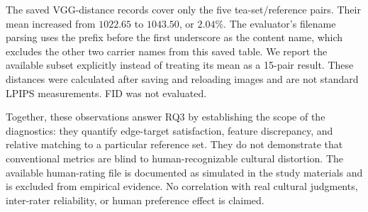 The saved VGG-distance records cover only the five tea-set/reference pairs. Their mean increased from $1022.65$ to $1043.50$, or $2.04\%$. The evaluator's filename parsing uses the prefix before the first underscore as the content name, which excludes the other two carrier names from this saved table. We report the available subset explicitly instead of treating its mean as a 15-pair result. These distances were calculated after saving and reloading images and are not standard LPIPS measurements. FID was not evaluated.

Together, these observations answer RQ3 by establishing the scope of the diagnostics: they quantify edge-target satisfaction, feature discrepancy, and relative matching to a particular reference set. They do not demonstrate that conventional metrics are blind to human-recognizable cultural distortion. The available human-rating file is documented as simulated in the study materials and is excluded from empirical evidence. No correlation with real cultural judgments, inter-rater reliability, or human preference effect is claimed.
